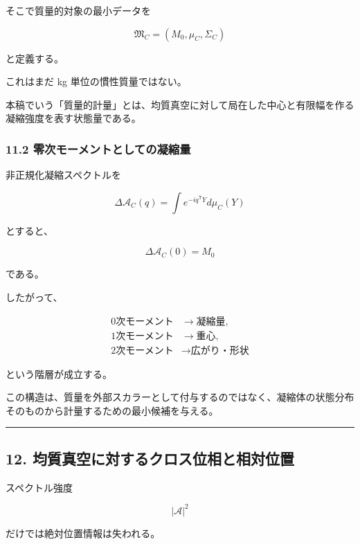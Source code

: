 \documentclass[
  a4paper,
]{ltjsarticle}
\begin{document}
そこで質量的対象の最小データを

\[
\boxed{
\mathfrak M_C
=
\left(
M_0,
\mu_C,
\Sigma_C
\right)
}
\tag{32}
\]

と定義する。

これはまだ kg 単位の慣性質量ではない。

本稿でいう「質量的計量」とは、均質真空に対して局在した中心と有限幅を作る凝縮強度を表す状態量である。

\subsubsection{11.2
零次モーメントとしての凝縮量}\label{ux96f6ux6b21ux30e2ux30fcux30e1ux30f3ux30c8ux3068ux3057ux3066ux306eux51ddux7e2eux91cf}

非正規化凝縮スペクトルを

\[
\Delta\mathcal A_C(q)
=
\int
 e^{-iq^{\mathsf T}Y}
d\mu_C(Y)
\tag{33}
\]

とすると、

\[
\boxed{
\Delta\mathcal A_C(0)
=
M_0
}
\tag{34}
\]

である。

したがって、

\[
\boxed{
\begin{aligned}
0\text{次モーメント}
&\longrightarrow
\text{凝縮量},\\
1\text{次モーメント}
&\longrightarrow
\text{重心},\\
2\text{次モーメント}
&\longrightarrow
\text{広がり・形状}
\end{aligned}
}
\tag{35}
\]

という階層が成立する。

この構造は、質量を外部スカラーとして付与するのではなく、凝縮体の状態分布そのものから計量するための最小候補を与える。

\begin{center}\rule{0.5\linewidth}{0.5pt}\end{center}

\subsection{12.
均質真空に対するクロス位相と相対位置}\label{ux5747ux8ceaux771fux7a7aux306bux5bfeux3059ux308bux30afux30edux30b9ux4f4dux76f8ux3068ux76f8ux5bfeux4f4dux7f6e}

スペクトル強度

\[
|\mathcal A|^2
\]

だけでは絶対位置情報は失われる。
\end{document}
